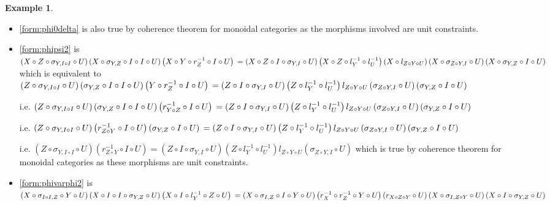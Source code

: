 \documentclass[nosumlimits,twoside]{amsart}
\theoremstyle{definition}
\newtheorem{example}[example]{\sc Example}
\theoremstyle{remark}
\newenvironment{invisible}{{\noindent\sc \colorbox{yellow}{Invisible:}\;}\color{gray}}{\medskip}
\begin{document}
\begin{example}
\begin{invisible}
\begin{itemize}
\item \eqref{form:phi0delta} is also true by coherence theorem for monoidal
categories as the morphisms involved are unit constraints.

\item \eqref{form:phipsi2} is 
$\left( X\circ Z\circ \sigma _{Y,I\circ I}\circ
U\right) \left( X\circ \sigma _{Y,Z}\circ I\circ I\circ U\right) \left(
X\circ Y\circ r_{Z}^{-1}\circ I\circ U\right) \\=\left( X\circ Z\circ I\circ
\sigma _{Y,I}\circ U\right) \left( X\circ Z\circ l_{Y}^{-1}\circ
l_{U}^{-1}\right) \left( X\circ l_{Z\circ Y\circ U}\right) \left( X\circ
\sigma _{Z\circ Y,I}\circ U\right) \left( X\circ \sigma _{Y,Z}\circ I\circ
U\right) $ 
which is equivalent to $\left( Z\circ \sigma _{Y,I\circ I}\circ
U\right) \left( \sigma _{Y,Z}\circ I\circ I\circ U\right) \left( Y\circ
r_{Z}^{-1}\circ I\circ U\right)\\ =\left( Z\circ I\circ \sigma _{Y,I}\circ
U\right) \left( Z\circ l_{Y}^{-1}\circ l_{U}^{-1}\right) l_{Z\circ Y\circ
U}\left( \sigma _{Z\circ Y,I}\circ U\right) \left( \sigma _{Y,Z}\circ I\circ
U\right) $ 

i.e. $\left( Z\circ \sigma _{Y,I\circ I}\circ U\right) \left(
\sigma _{Y,Z}\circ I\circ I\circ U\right) \left( r_{Y\circ Z}^{-1}\circ
I\circ U\right) \\=\left( Z\circ I\circ \sigma _{Y,I}\circ U\right) \left(
Z\circ l_{Y}^{-1}\circ l_{U}^{-1}\right) l_{Z\circ Y\circ U}\left( \sigma
_{Z\circ Y,I}\circ U\right) \left( \sigma _{Y,Z}\circ I\circ U\right) $ 

i.e.
$\left( Z\circ \sigma _{Y,I\circ I}\circ U\right) \left( r_{Z\circ
Y}^{-1}\circ I\circ U\right) \left( \sigma _{Y,Z}\circ I\circ U\right)
\\=\left( Z\circ I\circ \sigma _{Y,I}\circ U\right) \left( Z\circ
l_{Y}^{-1}\circ l_{U}^{-1}\right) l_{Z\circ Y\circ U}\left( \sigma _{Z\circ
Y,I}\circ U\right) \left( \sigma _{Y,Z}\circ I\circ U\right) $ 

i.e. $\left(
Z\circ \sigma _{Y,I\circ I}\circ U\right) \left( r_{Z\circ Y}^{-1}\circ
I\circ U\right) =\left( Z\circ I\circ \sigma _{Y,I}\circ U\right) \left(
Z\circ l_{Y}^{-1}\circ l_{U}^{-1}\right) l_{Z\circ Y\circ U}\left( \sigma
_{Z\circ Y,I}\circ U\right) $ which is true by coherence theorem for
monoidal categories as these morphisms are unit constraints.

\item \eqref{form:phivarphi2} is $\left( X\circ \sigma _{I\circ I,Z}\circ Y\circ U\right) \left( X\circ
I\circ I\circ \sigma _{Y,Z}\circ U\right) \left( X\circ I\circ
l_{Y}^{-1}\circ Z\circ U\right)\\ =\left( X\circ \sigma _{I,Z}\circ I\circ
Y\circ U\right) \left( r_{X}^{-1}\circ r_{Z}^{-1}\circ Y\circ U\right)
\left( r_{X\circ Z\circ Y}\circ U\right) \left( X\circ \sigma _{I,Z\circ
Y}\circ U\right) \left( X\circ I\circ \sigma _{Y,Z}\circ U\right) $


\end{itemize}
\end{invisible}
\end{example}
\end{document}
